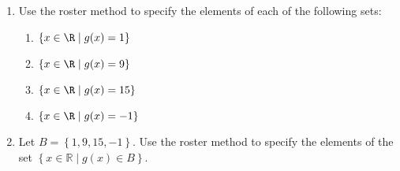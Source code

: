 \begin{previewactivity}
\begin{enumerate}
\item Use the roster method to specify the elements of each of the following sets:
\begin{multicols}{2}
\begin{enumerate}
\item $\left\{ x \in \R \mid g( x ) = 1 \right\}$
\item $\left\{ x \in \R \mid g( x ) = 9 \right\}$
\item $\left\{ x \in \R \mid g( x ) = 15 \right\}$
\item $\left\{ x \in \R \mid g( x ) = -1 \right\}$
\end{enumerate}
\end{multicols}

\item Let $B = \left\{ 1, 9, 15, -1 \right\}$.  Use the roster method to specify the elements of the set $\left\{ x \in \mathbb{R} \mid g ( x ) \in B \right\}$.
\end{enumerate}

\end{previewactivity}
\hbreak

\endinput
